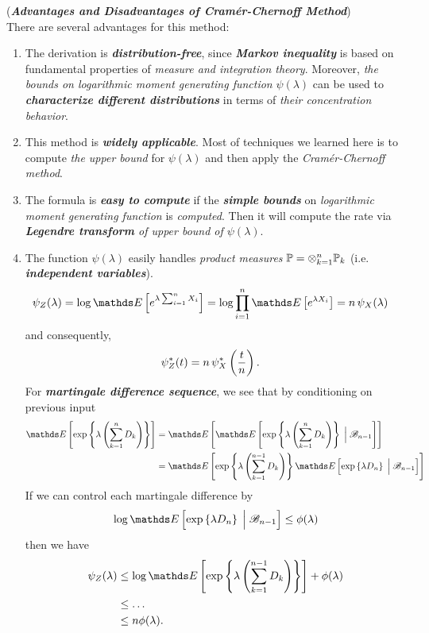 \documentclass[11pt]{article}
\begin{document}
\begin{enumerate}
\begin{remark} (\textbf{\emph{Advantages and Disadvantages of  Cram{\'e}r-Chernoff Method}})\\
There are several advantages for this method:
\begin{enumerate}
\item The derivation is \textbf{\emph{distribution-free}}, since \emph{\textbf{Markov inequality}} is based on fundamental properties of \emph{measure and integration theory}. Moreover, \emph{the bounds on logarithmic moment generating function} $\psi(\lambda)$ can be used to \emph{\textbf{characterize different distributions}} in terms of \emph{their concentration behavior}.

\item This method is \emph{\textbf{widely applicable}}. Most of techniques we learned here is to compute \emph{the upper bound} for $\psi(\lambda)$ and then apply the \emph{Cram{\'e}r-Chernoff method}. 

\item The formula is \emph{\textbf{easy to compute}} if the \emph{\textbf{simple bounds}} on \emph{logarithmic moment generating function} is \emph{computed}. Then it will compute the rate via \emph{\textbf{Legendre transform} of upper bound of $\psi(\lambda)$}.

\item The function $\psi(\lambda)$ easily handles \emph{product measures} ${\mathbb P} = \otimes_{k=1}^{n}{\mathbb P}_k$ (i.e. \emph{\textbf{independent variables}}).
\begin{align*}
\psi_Z(\lambda) &= \log \E{}{e^{\lambda\sum_{i=1}^{n}X_i}} = \log \prod_{i=1}^{n}\E{}{e^{\lambda X_i}}  = n\, \psi_{X}(\lambda)
\end{align*} and consequently,
\begin{align*}
\psi_Z^{*}(t) &= n\,\psi_{X}^{*}\left(\frac{t}{n}\right).
\end{align*} For \textbf{\emph{martingale difference sequence}}, we see that by conditioning on previous input
\begin{align*}
\E{}{\exp\set{\lambda \paren{\sum_{k=1}^{n}D_k }}} &= \E{}{\E{}{\exp\set{\lambda \paren{\sum_{k=1}^{n}D_k }} \;\Big|\; \srB_{n-1} }} \\
&= \E{}{\exp\set{\lambda \paren{\sum_{k=1}^{n-1}D_k }} \E{}{\exp\set{\lambda D_n }  \;\Big|\; \srB_{n-1}}}
\end{align*} If we can control each martingale difference by 
\begin{align*}
\log \E{}{\exp\set{\lambda D_n }  \;\Big|\; \srB_{n-1}} \le  \phi(\lambda)
\end{align*} then we have 
\begin{align*}
\psi_Z(\lambda) &\le \log \E{}{\exp\set{\lambda \paren{\sum_{k=1}^{n-1}D_k }}} + \phi(\lambda) \\
&\le \ldots \\
&\le n \phi(\lambda).
\end{align*}
\end{enumerate}


\end{remark}
\end{enumerate}
\end{document}
